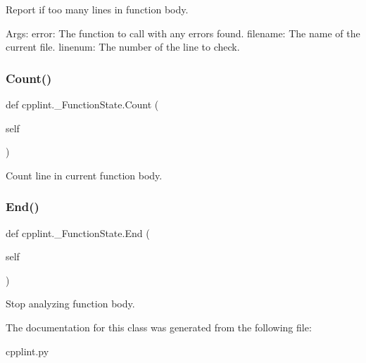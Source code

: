 \begin{DoxyVerb}Report if too many lines in function body.

Args:
  error: The function to call with any errors found.
  filename: The name of the current file.
  linenum: The number of the line to check.
\end{DoxyVerb}
 \mbox{\label{classcpplint_1_1__FunctionState_ac25c9711911ae181b091b52619cf2701}} 
\subsubsection{\texorpdfstring{Count()}{Count()}}
{\footnotesize\ttfamily def cpplint.\+\_\+\+Function\+State.\+Count (\begin{DoxyParamCaption}\item[{}]{self }\end{DoxyParamCaption})}

\begin{DoxyVerb}Count line in current function body.\end{DoxyVerb}
 \mbox{\label{classcpplint_1_1__FunctionState_a1ab6b0a575c25c135f9004b7fb12dc4a}} 
\subsubsection{\texorpdfstring{End()}{End()}}
{\footnotesize\ttfamily def cpplint.\+\_\+\+Function\+State.\+End (\begin{DoxyParamCaption}\item[{}]{self }\end{DoxyParamCaption})}

\begin{DoxyVerb}Stop analyzing function body.\end{DoxyVerb}
 

The documentation for this class was generated from the following file\+:\begin{DoxyCompactItemize}
\item 
cpplint.\+py\end{DoxyCompactItemize}
